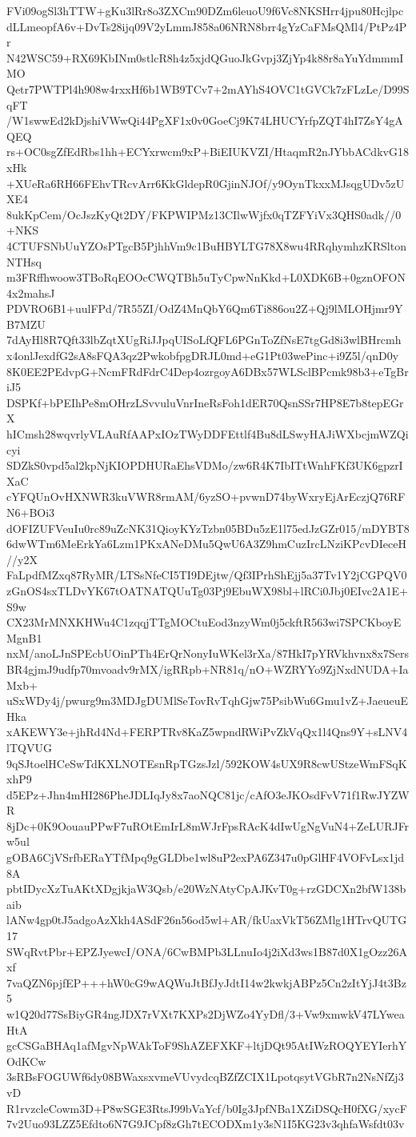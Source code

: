 FVi09ogSl3hTTW+gKu3lRr8o3ZXCm90DZm6leuoU9f6Vc8NKSHrr4jpu80Hcjlpc
dLLmeopfA6v+DvTs28ijq09V2yLmmJ858a06NRN8brr4gYzCaFMsQMl4/PtPz4Pr
N42WSC59+RX69KbINm0stlcR8h4z5xjdQGuoJkGvpj3ZjYp4k88r8aYuYdmmmIMO
Qetr7PWTPl4h908w4rxxHf6b1WB9TCv7+2mAYhS4OVC1tGVCk7zFLzLe/D99SqFT
/W1swwEd2kDjshiVWwQi44PgXF1x0v0GoeCj9K74LHUCYrfpZQT4hI7ZsY4gAQEQ
rs+OC0sgZfEdRbs1hh+ECYxrwcm9xP+BiEIUKVZI/HtaqmR2nJYbbACdkvG18xHk
+XUeRa6RH66FEhvTRcvArr6KkGldepR0GjinNJOf/y9OynTkxxMJsqgUDv5zUXE4
8ukKpCem/OcJszKyQt2DY/FKPWIPMz13CIlwWjfx0qTZFYiVx3QHS0adk//0+NKS
4CTUFSNbUuYZOsPTgcB5PjhhVm9c1BuHBYLTG78X8wu4RRqhymhzKRSltonNTHsq
m3FRffhwoow3TBoRqEOOcCWQTBh5uTyCpwNnKkd+L0XDK6B+0gznOFON4x2mahsJ
PDVRO6B1+uulFPd/7R55ZI/OdZ4MnQbY6Qm6Ti886ou2Z+Qj9lMLOHjmr9YB7MZU
7dAyHl8R7Qft33lbZqtXUgRiJJpqUISoLfQFL6PGnToZfNsE7tgGd8i3wlBHrcmh
x4onlJexdfG2sA8sFQA3qz2PwkobfpgDRJL0md+eG1Pt03wePinc+i9Z5l/qnD0y
8K0EE2PEdvpG+NcmFRdFdrC4Dep4ozrgoyA6DBx57WLSclBPcmk98b3+eTgBriJ5
DSPKf+bPEIhPe8mOHrzLSvvuluVnrIneRsFoh1dER70QsnSSr7HP8E7b8tepEGrX
hICmsh28wqvrlyVLAuRfAAPxIOzTWyDDFEttlf4Bu8dLSwyHAJiWXbcjmWZQicyi
SDZkS0vpd5al2kpNjKIOPDHURaEhsVDMo/zw6R4K7IbITtWnhFKf3UK6gpzrIXaC
cYFQUnOvHXNWR3kuVWR8rmAM/6yzSO+pvwnD74byWxryEjArEczjQ76RFN6+BOi3
dOFIZUFVeuIu0rc89uZcNK31QioyKYzTzbn05BDu5zE1l75edJzGZr015/mDYBT8
6dwWTm6MeErkYa6Lzm1PKxANeDMu5QwU6A3Z9hmCuzIrcLNziKPcvDIeceH//y2X
FaLpdfMZxq87RyMR/LTSsNfeCI5TI9DEjtw/Qf3IPrhShEjj5a37Tv1Y2jCGPQV0
zGnOS4sxTLDvYK67tOATNATQUuTg03Pj9EbuWX98bl+lRCi0Jbj0EIvc2A1E+S9w
CX23MrMNXKHWu4C1zqqjTTgMOCtuEod3nzyWm0j5ckftR563wi7SPCKboyEMgnB1
nxM/anoLJnSPEcbUOinPTh4ErQrNonyIuWKel3rXa/87HkI7pYRVkhvnx8x7Sers
BR4gjmJ9udfp70mvoadv9rMX/igRRpb+NR81q/nO+WZRYYo9ZjNxdNUDA+IaMxb+
uSxWDy4j/pwurg9m3MDJgDUMlSeTovRvTqhGjw75PsibWu6Gmu1vZ+JaeueuEHka
xAKEWY3e+jhRd4Nd+FERPTRv8KaZ5wpndRWiPvZkVqQx1l4Qns9Y+sLNV4lTQVUG
9qSJtoelHCeSwTdKXLNOTEsnRpTGzsJzl/592KOW4sUX9R8cwUStzeWmFSqKxhP9
d5EPz+Jhn4mHI286PheJDLIqJy8x7aoNQC81jc/cAfO3eJKOsdFvV71f1RwJYZWR
8jDc+0K9OouauPPwF7uROtEmIrL8mWJrFpsRAcK4dIwUgNgVuN4+ZeLURJFrw5ul
gOBA6CjVSrfbERaYTfMpq9gGLDbe1wl8uP2exPA6Z347u0pGlHF4VOFvLsx1jd8A
pbtIDycXzTuAKtXDgjkjaW3Qsb/e20WzNAtyCpAJKvT0g+rzGDCXn2bfW138baib
lANw4gp0tJ5adgoAzXkh4ASdF26n56od5wl+AR/fkUaxVkT56ZMlg1HTrvQUTG17
SWqRvtPbr+EPZJyewcI/ONA/6CwBMPb3LLnuIo4j2iXd3ws1B87d0X1gOzz26Axf
7vaQZN6pjfEP+++hW0cG9wAQWuJtBfJyJdtI14w2kwkjABPz5Cn2zItYjJ4t3Bz5
w1Q20d77SsBiyGR4ngJDX7rVXt7KXPs2DjWZo4YyDfl/3+Vw9xmwkV47LYweaHtA
gcCSGaBHAq1afMgvNpWAkToF9ShAZEFXKF+ltjDQt95AtIWzROQYEYIerhYOdKCw
3sRBsFOGUWf6dy08BWaxsxvmeVUvydcqBZfZCIX1LpotqsytVGbR7n2NsNfZj3vD
R1rvzcleCowm3D+P8wSGE3RtsJ99bVaYcf/b0Ig3JpfNBa1XZiDSQcH0fXG/xycF
7v2Uuo93LZZ5Efdto6N7G9JCpf8zGh7tECODXm1y3sN1I5KG23v3qhfaWsfdt03v
